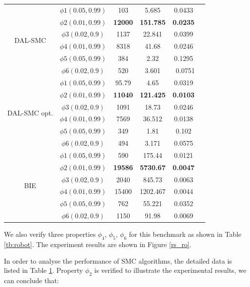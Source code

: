 \begin{table}
\begin{tabular}{c c c c c c}
        \hline 
        \multirow{6}{1.5cm}{DAL-SMC}  
                & $\phi1(0.05,0.99)$ &  103&  5.685&  0.0433\\ 
                & $\phi2(0.01,0.99)$ &  \textbf{12000}&  \textbf{151.785} &  \textbf{0.0235} \\ 
                & $\phi3(0.02,0.9)$ &  1137& 22.841& 0.0399\\ 
                & $\phi4(0.01,0.99)$ &  8318&  41.68 &  0.0246\\ 
                & $\phi5(0.05,0.99)$ &  384&  2.32&  0.1295\\ 
                & $\phi6(0.02,0.9)$ &  520& 3.601& \ 0.0751\\      
        \hline 
         \multirow{6}{1.5cm}{DAL-SMC opt.}  
                & $\phi1(0.05,0.99)$ &  95.79&  4.65&  0.0319\\ 
                & $\phi2(0.01,0.99)$ &  \textbf{11040}&  \textbf{121.425} &  \textbf{0.0103}\\ 
                & $\phi3(0.02,0.9)$ &  1091& 18.73& 0.0246\\ 
                & $\phi4(0.01,0.99)$ &  7569&  36.512 &  0.0138\\ 
                & $\phi5(0.05,0.99)$ &  349&  1.81&  0.102\\ 
                & $\phi6(0.02,0.9)$ &  494& 3.171& 0.0575\\     
        \hline 
         \multirow{6}{1.5cm}{BIE}  
                & $\phi1(0.05,0.99)$ &  590&  175.44&  0.0121\\ 
                & $\phi2(0.01,0.99)$ &  \textbf{19586}&  \textbf{5730.67} &  \textbf{0.0047} \\ 
                & $\phi3(0.02,0.9)$ &  2040& 845.73& 0.0063\\ 
                & $\phi4(0.01,0.99)$ & 15400&  1202.467 &  0.0044\\ 
                & $\phi5(0.05,0.99)$ &  762&  55.221&  0.0352\\ 
                & $\phi6(0.02,0.9)$ &  1150& 91.98& 0.0069\\      
        \hline 
\end{tabular} 
\label{ta-rs}
\end{table}
We also verify three properties $\phi_4$, $\phi_5$, $\phi_6$ for this benchmark as shown in Table \ref{tb:robot}. The experiment results are shown in Figure \ref{rs_ro}. 

In order to analyse the performance of SMC algorithms, the detailed data is listed in Table \ref{ta-rs}. Property $\phi_2$ is verified to illustrate the experimental results, we can conclude that: 

